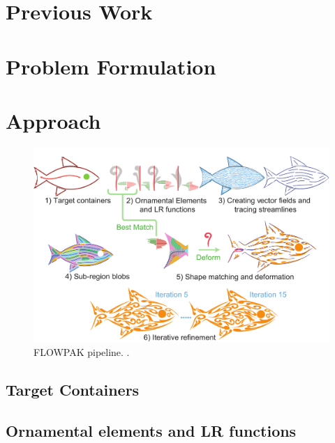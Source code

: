 \section{Previous Work}


\section{Problem Formulation}


\section{Approach}


\begin{figure}
\centering
\includegraphics[width=1.0\textwidth]{figures/flowpak/pipeline.pdf} 
\caption{\label{fig_flowpak_pipeline} 
FLOWPAK pipeline. .}
\end{figure}

\subsection{Target Containers}


\subsection{Ornamental elements and LR functions}

